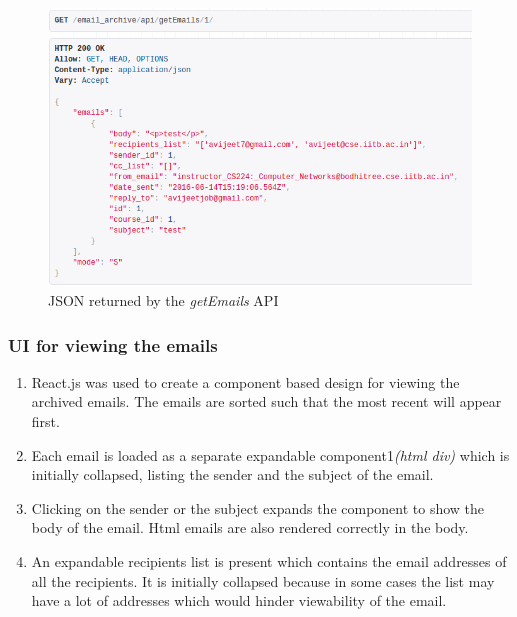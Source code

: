 \begin{figure}[h]
\centering
\includegraphics[width=0.95\linewidth]{./media/get_emails}
\caption{JSON returned by the \textit{getEmails} API}
\label{fig:get_emails}
\end{figure}

\subsubsection{UI for viewing the emails}

\begin{enumerate}
	\item React.js was used to create a component based design for viewing the archived emails. The emails are sorted such that the most recent will appear first.
	\item Each email is loaded as a separate expandable component1\textit{(html div)} which is initially collapsed, listing the sender and the subject of the email.
	\item Clicking on the sender or the subject expands the component to show the body of the email. Html emails are also rendered correctly in the body.
	\item An expandable recipients list is present which contains the email addresses of all the recipients. It is initially collapsed because in some cases the list may have a lot of addresses which would hinder viewability of the email.
\end{enumerate}

